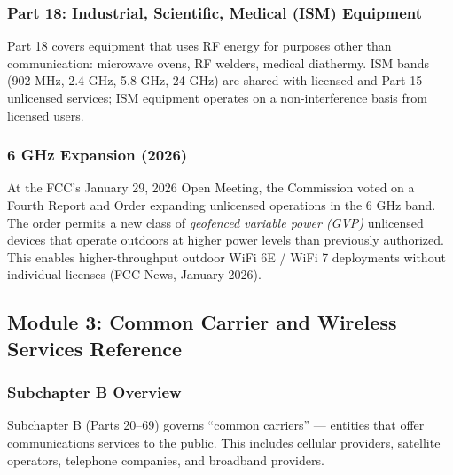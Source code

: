 \documentclass[11pt,letterpaper]{article}
\begin{document}
\subsubsection{Part 18: Industrial, Scientific, Medical (ISM) Equipment}

Part 18 covers equipment that uses RF energy for purposes other than communication: microwave ovens, RF welders, medical diathermy. ISM bands (902 MHz, 2.4 GHz, 5.8 GHz, 24 GHz) are shared with licensed and Part 15 unlicensed services; ISM equipment operates on a non-interference basis from licensed users.

\subsubsection{6 GHz Expansion (2026)}

At the FCC's January 29, 2026 Open Meeting, the Commission voted on a Fourth Report and Order expanding unlicensed operations in the 6 GHz band. The order permits a new class of \textit{geofenced variable power (GVP)} unlicensed devices that operate outdoors at higher power levels than previously authorized. This enables higher-throughput outdoor WiFi 6E / WiFi 7 deployments without individual licenses (FCC News, January 2026).

\subsection{Module 3: Common Carrier and Wireless Services Reference}

\subsubsection{Subchapter B Overview}

Subchapter B (Parts 20--69) governs ``common carriers'' --- entities that offer communications services to the public. This includes cellular providers, satellite operators, telephone companies, and broadband providers.
\end{document}
